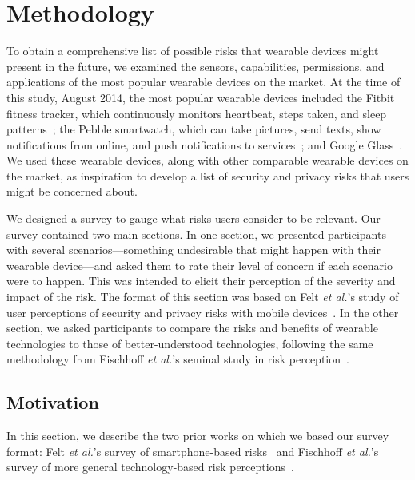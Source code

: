 
\section{Methodology}
To obtain a comprehensive list of possible risks that wearable devices might present in the future, we examined the sensors, capabilities, permissions, and applications of the most popular wearable devices on the market. At the time of this study, August 2014, the most popular wearable devices included the Fitbit fitness tracker, which continuously monitors heartbeat, steps taken, and sleep patterns~\cite{6_fitbit_2014, 7_time_2014}; the Pebble smartwatch, which can take pictures, send texts, show notifications from online, and push notifications to services~\cite{pebble_smartwatch_2014, 9_verge_2014, 10_readwrite_2014}; and Google Glass~\cite{11_wikipedia_2015, 12_turi_2014}. We used these wearable devices, along with other comparable wearable devices on the market, as inspiration to develop a list of security and privacy risks that users might be concerned about.

We designed a survey to gauge what risks users consider to be relevant.
Our survey contained two main sections. In one section, we presented participants with several scenarios---something undesirable that might happen with their wearable device---and asked them to rate their level of concern if each scenario were to happen. This was intended to elicit their perception of the severity and impact of the risk.
The format of this section was based on Felt {\it et al.}'s study of user perceptions of security and privacy risks with mobile devices~\cite{Felt}. In the other section, we asked participants to compare the risks and benefits of wearable technologies to those of better-understood technologies, following the same methodology from Fischhoff {\it et al.}'s seminal study in risk perception~\cite{Fischhoff}.

\subsection{Motivation}
In this section, we describe the two prior works on which we based our survey format: Felt {\it et al.}'s survey of smartphone-based risks~\cite{Felt} and Fischhoff {\it et al.}'s survey of more general technology-based risk perceptions~\cite{Fischhoff}.

